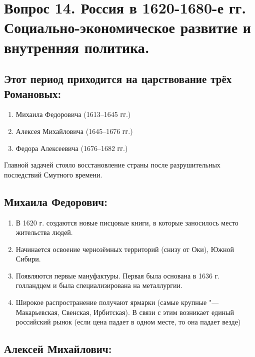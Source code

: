 \section{Вопрос 14. Россия в 1620-1680-е гг. Социально-экономическое развитие и внутренняя политика.}

\subsection{Этот период приходится на царствование трёх Романовых:}

\begin{enumerate}
    \item{ Михаила Федоровича (1613--1645 гг.) }
    \item{ Алексея Михайловича (1645--1676 гг.) }
    \item{ Федора Алексеевича (1676--1682 гг.) }
\end{enumerate}

Главной задачей стояло восстановление страны после разрушительных последствий Смутного времени.

\subsection{Михаила Федорович:}

\begin{enumerate}
    \item{ В 1620 г. создаются новые писцовые книги, в которые заносилось место жительства людей. }
    \item{ Начинается освоение чернозёмных территорий (снизу от Оки), Южной Сибири. }
    \item{ Появляются первые мануфактуры. Первая была основана в 1636 г. голландцем и была специализирована на металлургии. }
    \item{ Широкое распространение получают ярмарки (самые крупные "--- Макарьевская, Свенская, Ирбитская). В связи с этим возникает единый российский рынок (если цена падает в одном месте, то она падает везде) }
\end{enumerate}

\subsection{Алексей Михайлович:}

